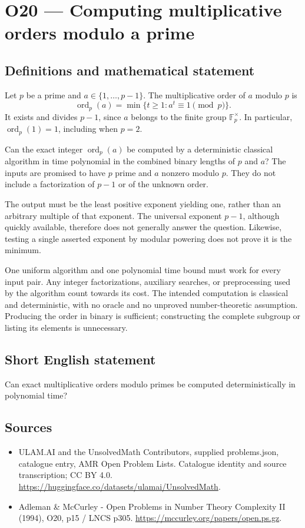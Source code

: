 \documentclass[11pt,a4paper]{article}
\begin{document}
\section*{O20 — Computing multiplicative orders modulo a prime}\label{statement}

\subsection{Definitions and mathematical statement}
Let $p$ be a prime and $a\in\{1,\ldots,p-1\}$. The multiplicative order of $a$ modulo $p$ is
\[
\operatorname{ord}_p(a)=\min\{t\ge1:a^t\equiv1\pmod p\}.
\]
It exists and divides $p-1$, since $a$ belongs to the finite group $\mathbb F_p^\times$. In particular, $\operatorname{ord}_p(1)=1$, including when $p=2$.

Can the exact integer $\operatorname{ord}_p(a)$ be computed by a deterministic classical algorithm in time polynomial in the combined binary lengths of $p$ and $a$? The inputs are promised to have $p$ prime and $a$ nonzero modulo $p$. They do not include a factorization of $p-1$ or of the unknown order.

The output must be the least positive exponent yielding one, rather than an arbitrary multiple of that exponent. The universal exponent $p-1$, although quickly available, therefore does not generally answer the question. Likewise, testing a single asserted exponent by modular powering does not prove it is the minimum.

One uniform algorithm and one polynomial time bound must work for every input pair. Any integer factorizations, auxiliary searches, or preprocessing used by the algorithm count towards its cost. The intended computation is classical and deterministic, with no oracle and no unproved number-theoretic assumption. Producing the order in binary is sufficient; constructing the complete subgroup or listing its elements is unnecessary.
\subsection{Short English statement}
Can exact multiplicative orders modulo primes be computed deterministically in polynomial time?
\subsection{Sources}
\begin{itemize}
\item[S1] ULAM.AI and the UnsolvedMath Contributors, supplied problems.json, catalogue entry, AMR Open Problem Lists. Catalogue identity and source transcription; CC BY 4.0.
\url{https://huggingface.co/datasets/ulamai/UnsolvedMath}.
\item[S2] Adleman \& McCurley - Open Problems in Number Theory Complexity II (1994), O20, p15 / LNCS p305. 
\url{https://mccurley.org/papers/open.ps.gz}.
\end{itemize}
\end{document}
